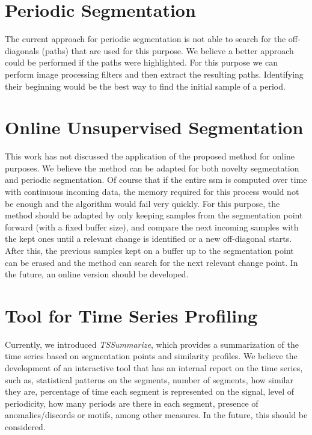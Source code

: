 \section{Periodic Segmentation}

The current approach for periodic segmentation is not able to search for the off-diagonals (paths) that are used for this purpose. We believe a better approach could be performed if the paths were highlighted. For this purpose we can perform image processing filters and then extract the resulting paths. Identifying their beginning would be the best way to find the initial sample of a period. 

\section{Online Unsupervised Segmentation}

This work has not discussed the application of the proposed method for online purposes. We believe the method can be adapted for both novelty segmentation and periodic segmentation. Of course that if the entire \gls{ssm} is computed over time with continuous incoming data, the memory required for this process would not be enough and the algorithm would fail very quickly. For this purpose, the method should be adapted by only keeping samples from the segmentation point forward (with a fixed buffer size), and compare the next incoming samples with the kept ones until a relevant change is identified or a new off-diagonal starts. After this, the previous samples kept on a buffer up to the segmentation point can be erased and the method can search for the next relevant change point. In the future, an online version should be developed.


\section{Tool for Time Series Profiling}

Currently, we introduced \textit{TSSummarize}, which provides a summarization of the time series based on segmentation points and similarity profiles. We believe the development of an interactive tool that has an internal report on the time series, such as, statistical patterns on the segments, number of segments, how similar they are, percentage of time each segment is represented on the signal, level of periodicity, how many periods are there in each segment, presence of anomalies/discords or motifs, among other measures. In the future, this should be considered.


